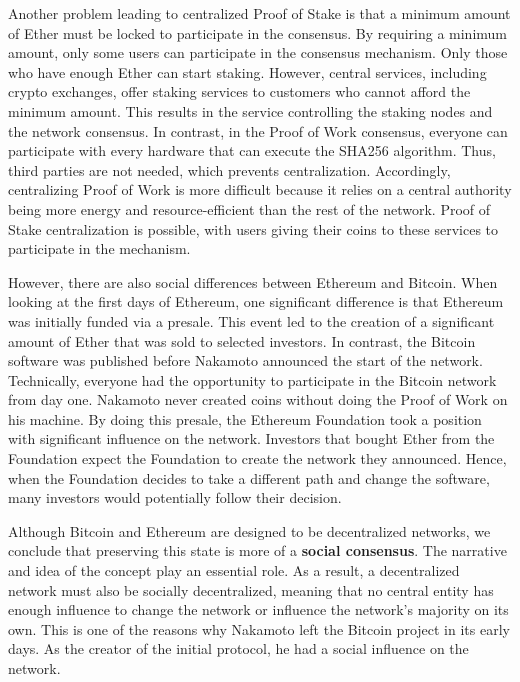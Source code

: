 Another problem leading to centralized Proof of Stake is that a minimum amount of Ether must be locked to participate in the consensus.
By requiring a minimum amount, only some users can participate in the consensus mechanism.
Only those who have enough Ether can start staking.
However, central services, including crypto exchanges, offer staking services to customers who cannot afford the minimum amount.
This results in the service controlling the staking nodes and the network consensus.
In contrast, in the Proof of Work consensus, everyone can participate with every hardware that can execute the SHA256 algorithm.
Thus, third parties are not needed, which prevents centralization.
Accordingly, centralizing Proof of Work is more difficult because it relies on a central authority being more energy and resource-efficient than the rest of the network.
Proof of Stake centralization is possible, with users giving their coins to these services to participate in the mechanism.

However, there are also social differences between Ethereum and Bitcoin.
When looking at the first days of Ethereum, one significant difference is that Ethereum was initially funded via a presale.
This event led to the creation of a significant amount of Ether that was sold to selected investors.
In contrast, the Bitcoin software was published before Nakamoto announced the start of the network.
Technically, everyone had the opportunity to participate in the Bitcoin network from day one. 
Nakamoto never created coins without doing the Proof of Work on his machine.
By doing this presale, the Ethereum Foundation took a position with significant influence on the network.
Investors that bought Ether from the Foundation expect the Foundation to create the network they announced.
Hence, when the Foundation decides to take a different path and change the software, many investors would potentially follow their decision. \cite{eth_presale}

Although Bitcoin and Ethereum are designed to be decentralized networks, we conclude that preserving this state is more of a \textbf{social consensus}.
The narrative and idea of the concept play an essential role. 
As a result, a decentralized network must also be socially decentralized, meaning that no central entity has enough influence to change the network or influence the network's majority on its own.
This is one of the reasons why Nakamoto left the Bitcoin project in its early days. 
As the creator of the initial protocol, he had a social influence on the network. 

